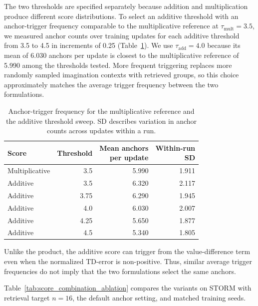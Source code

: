 \documentclass{article} %
\begin{document}
The two thresholds are specified separately because addition and multiplication produce different score distributions. To select an additive threshold with an anchor-trigger frequency comparable to the multiplicative reference at $\tau_{\mathrm{mult}}=3.5$, we measured anchor counts over training updates for each additive threshold from 3.5 to 4.5 in increments of 0.25 (Table~\ref{tab:score_combination_trigger_frequency}). We use $\tau_{\mathrm{add}}=4.0$ because its mean of 6.030 anchors per update is closest to the multiplicative reference of 5.990 among the thresholds tested. More frequent triggering replaces more randomly sampled imagination contexts with retrieved groups, so this choice approximately matches the average trigger frequency between the two formulations.

\begin{table}[!htbp]
\centering
\small
\caption{Anchor-trigger frequency for the multiplicative reference and the additive threshold sweep. SD describes variation in anchor counts across updates within a run.}
\label{tab:score_combination_trigger_frequency}
\begin{tabular}{lrrr}
\toprule
Score & Threshold & \shortstack{Mean anchors\\per update} & \shortstack{Within-run\\SD} \\
\midrule
Multiplicative & 3.5 & 5.990 & 1.911 \\
\midrule
Additive & 3.5 & 6.320 & 2.117 \\
Additive & 3.75 & 6.290 & 1.945 \\
Additive & 4.0 & 6.030 & 2.007 \\
Additive & 4.25 & 5.650 & 1.877 \\
Additive & 4.5 & 5.340 & 1.805 \\
\bottomrule
\end{tabular}
\end{table}

Unlike the product, the additive score can trigger from the value-difference term even when the normalized TD-error is non-positive. Thus, similar average trigger frequencies do not imply that the two formulations select the same anchors.

Table~\ref{tab:score_combination_ablation} compares the variants on STORM with retrieval target $n=16$, the default anchor setting, and matched training seeds.
\end{document}
